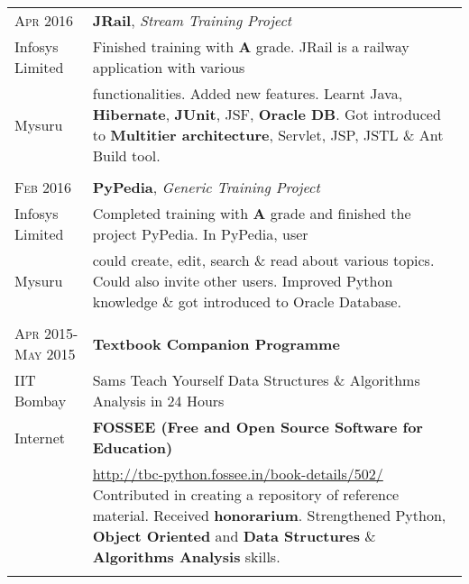 \documentclass[a4paper,10pt]{article} %
\begin{document}
\begin{tabular}{l|p{11cm}}



\textsc{Apr 2016} & \textbf{JRail}, \emph{Stream Training Project} \emph{}\\
Infosys Limited & \footnotesize{Finished training with \textbf{A} grade. JRail is a railway application with various}\\
Mysuru & \footnotesize{functionalities. Added new features. Learnt Java, \textbf{Hibernate}, \textbf{JUnit}, JSF, \textbf{Oracle DB}. Got introduced to \textbf{Multitier architecture}, Servlet, JSP, JSTL \& Ant Build tool.}\\
\multicolumn{2}{c}{} \\


\textsc{Feb 2016} & \textbf{PyPedia}, \emph{Generic Training Project} \emph{}\\
Infosys Limited & \footnotesize{Completed training with \textbf{A} grade and finished the project PyPedia. In PyPedia, user}\\
Mysuru & \footnotesize{could create, edit, search \& read about various topics. Could also invite other users. Improved Python knowledge \& got introduced to Oracle Database.}\\
\multicolumn{2}{c}{} \\


\textsc{Apr 2015-May 2015} & \textbf{Textbook Companion Programme} \emph{}\\
IIT Bombay & \footnotesize{Sams Teach Yourself Data Structures \& Algorithms Analysis in 24 Hours}\\
Internet & \footnotesize{\textbf{FOSSEE (Free and Open Source Software for Education)}}\\
& \footnotesize{\href{http://tbc-python.fossee.in/book-details/502/}{http://tbc-python.fossee.in/book-details/502/} Contributed in creating a repository of reference material. Received \textbf{honorarium}. Strengthened Python, \textbf{Object Oriented} and \textbf{Data Structures} \& \textbf{Algorithms Analysis} skills.}\\
\multicolumn{2}{c}{} \\


\end{tabular}
\end{document}
